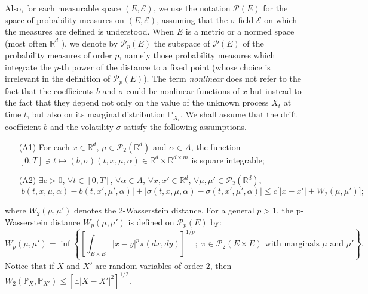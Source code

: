 \documentclass[11pt]{amsart}
\begin{document}
Also, for each measurable space $(E,{\mathcal E})$, we use the notation ${\mathcal P}(E)$ for the space of probability measures on $(E,{\mathcal E})$, assuming that the $\sigma$-field ${\mathcal E}$ on which the measures are defined is understood. When $E$ is a metric or a normed space (most often ${\mathbb R}^d$
), we denote by ${\mathcal P}_p(E)$ the subspace of ${\mathcal P}(E)$ of the probability measures of order $p$, namely those probability measures which integrate the $p$-th power of the distance to a fixed point (whose choice is irrelevant in the definition of ${\mathcal P}_p(E)$).
The term \emph{nonlinear} does not refer to the fact that the coefficients $b$ and $\sigma$ could be nonlinear functions of  $x$ but instead to the fact that they depend not only on the value of the unknown process $X_t$ at time $t$, but also on its marginal distribution ${\mathbb P}_{X_t}$.
We shall assume that the drift coefficient $b$ and the volatility $\sigma$ satisfy the following assumptions.
\begin{itemize}
\item[(A1)] \hskip 6pt For each $x\in{\mathbb R}^d$, $\mu\in{\mathcal P}_2({\mathbb R}^d)$ and $\alpha\in A$, the function 
$[0,T] \ni t \mapsto (b,\sigma)(t,x,\mu,\alpha) \in {\mathbb R}^d \times {\mathbb R}^{d \times m}$ is square integrable;
\item[(A2)] \hskip 6pt  $\exists c>0$, $\forall t\in[0,T]$,  $\forall \alpha\in A$,  $\forall x,x'\in{\mathbb R}^d$,  $\forall \mu,\mu'\in{\mathcal P}_2({\mathbb R}^d)$,
$$
|b(t,x,\mu,\alpha)-b(t,x',\mu',\alpha)| +  |\sigma(t,x,\mu,\alpha)-\sigma(t,x',\mu',\alpha)|\le c \bigl[ 
|x-x'|+W_2(\mu,\mu') \bigr];
$$
\end{itemize} 
where $W_2(\mu,\mu')$ denotes the 2-Wasserstein distance. For a general $p>1$, the p-Wasserstein distance $W_p(\mu,\mu')$ is defined on ${\mathcal P}_p(E)$ by:
$$
W_p(\mu,\mu')=\inf\left\{\left[\int_{E \times E} |x-y|^p\pi(dx,dy)\right]^{1/p};\;\pi\in{\mathcal P}_2(E\times E) \text{ with marginals } \mu \text{ and } \mu'\right\}.
$$
Notice that if $X$ and $X'$ are random variables of order $2$, then  $W_2({\mathbb P}_X,{\mathbb P}_{X'})\le [{\mathbb E}|X-X'|^2]^{1/2}$.
\end{document}
